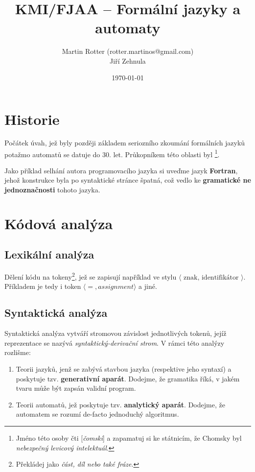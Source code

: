 \documentclass[10pt, a4paper, titlepage]{article}
\title{KMI/FJAA  -- Formální jazyky a automaty}
\author{Martin Rotter (rotter.martinos@gmail.com) \\
	Jiří Zehnula}
\date{\today}
\theoremstyle{note}
\begin{document}
\maketitle

\section{Historie}
Počátek úvah, jež byly později základem seriozního zkoumání formálních jazyků potažmo automatů se datuje do 30. let.
Průkopníkem této oblasti byl 
\footnote{Jméno této osoby čti [\emph{čomski}] a zapamatuj si ke státnicím, že Chomsky byl \emph{nebezpečný levicový intelektuál}.}.

Jako příklad selhání autora programovacího jazyka si uveďme jazyk \textbf{Fortran}, jehož konstrukce byla po syntaktické stránce špatná,
což vedlo ke \textbf{gramatické ne jednoznačnosti} tohoto jazyka.

\section{Kódová analýza}
\subsection{Lexikální analýza}
Dělení kódu na tokeny\footnote{Překládej jako \emph{část, díl nebo také fráze}.}, jež se zapisují například ve stylu
$\langle\text{ znak, identifikátor }\rangle$.
Příkladem je tedy i token $\langle =, assignment \rangle$ a jiné.

\subsection{Syntaktická analýza}
Syntaktická analýza vytváří stromovou závislost jednotlivých tokenů, jejíž reprezentace se nazývá \emph{syntaktický-derivační strom}.
V rámci této analýzy rozlišme:
\begin{enumerate}
\item
Teorii jazyků, jenž se zabývá stavbou jazyka (respektive jeho syntaxí) a poskytuje tzv. \textbf{generativní aparát}.
Dodejme, že gramatika říká, v jakém tvaru může být zapsán validní program.

\item
Teorii automatů, jež poskytuje tzv. \textbf{analytický aparát}.
Dodejme, že automatem se rozumí de-facto jednoduchý algoritmus.
\end{enumerate}
\end{document}
